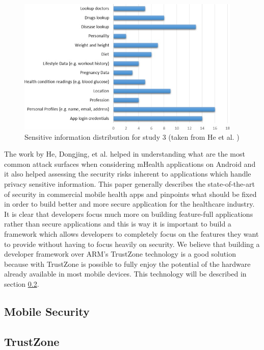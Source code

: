 \begin{figure}[hb!]
  \centering
  \includegraphics[width=0.95\textwidth]{img/sensitivedistribution.jpg}
  \caption{Sensitive information distribution for study 3 (taken from  He et al. \cite{he2014security})}
  \label{fig:sensitivedistribution}
\end{figure}

The work by He, Dongjing, et al. \cite{he2014security} helped in understanding what are the most common attack surfaces when considering mHealth applications on Android and it also helped assessing the security risks inherent to applications which handle privacy sensitive information. This paper generally describes the state-of-the-art of security in commercial mobile health apps and pinpoints what should be fixed in order to build better and more secure application for the healthcare industry. It is clear that developers focus much more on building feature-full applications rather than secure applications and this is way it is important to build a framework which allows developers to completely focus on the features they want to provide without having to focus heavily on security. We believe that building a developer framework over ARM's TrustZone technology is a good solution because with TrustZone is possible to fully enjoy the potential of the hardware already available in most mobile devices. This technology will be described in section \ref{sec:trustzone}. 

\subsection{Mobile Security}
%
%
\subsection{TrustZone}
\label{sec:trustzone}
%
%

